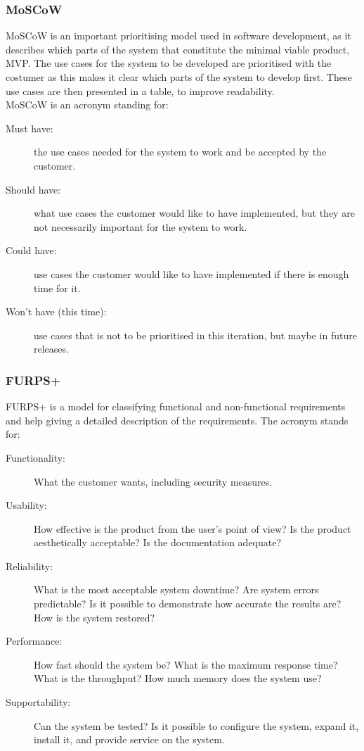 \subsubsection{MoSCoW}
MoSCoW is an important prioritising model used in software development, as it
describes which parts of the system that constitute the minimal viable product,
MVP. The use cases for the system to be developed are prioritised with the
costumer as this makes it clear which parts of the system to develop first.
These use cases are then presented in a table, to improve readability.\\

MoSCoW is an acronym standing for:\\

\begin{description}
    \item [Must have:] the use cases needed for the system to work and be
    accepted by the customer.

    \item [Should have:] what use cases the customer would like to have
    implemented, but they are not necessarily important for the system to work.

    \item [Could have:] use cases the customer would like to have implemented if
    there is enough time for it.

    \item [Won't have (this time):] use cases that is not to be prioritised in
    this iteration, but maybe in future releases.
\end{description}

\subsubsection{FURPS+}
FURPS+ is a model for classifying functional and non-functional requirements and
help giving a detailed description of the requirements. The acronym stands for:

\begin{description}
    \item [Functionality:] What the customer wants, including security measures.

    \item [Usability:] How effective is the product from the user's point of
    view? Is the product aesthetically acceptable? Is the documentation adequate?

    \item [Reliability:] What is the most acceptable system downtime? Are system
    errors predictable? Is it possible to demonstrate how accurate the results
    are? How is the system restored?

    \item [Performance:] How fast should the system be? What is the maximum
    response time? What is the throughput? How much memory does the system use?

    \item [Supportability:] Can the system be tested? Is it possible to
    configure the system, expand it, install it, and provide service on the
    system.
\end{description}

